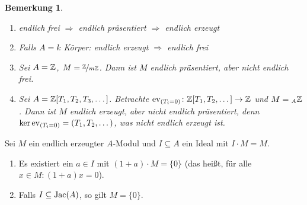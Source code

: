 \documentclass[12pt,a4paper]{scrartcl}
\theoremstyle{cplain}
\theoremstyle{cdef}
\newtheorem{beme}[thmcounter]{Bemerkung}
\begin{document}
\begin{beme}\label{bem:2.17}
	\leavevmode
	\begin{enumerate}
		\item endlich frei $\Rightarrow$ endlich präsentiert $\Rightarrow$ endlich erzeugt
		\item Falls $A = k$ Körper: endlich erzeugt $\Rightarrow$ endlich frei
		\item Sei $A = \mathbb Z$, $M = \nicefrac{\mathbb Z}{m\mathbb Z}$. Dann ist $M$ endlich präsentiert, aber nicht endlich frei.
		\item Sei $A = \mathbb Z[T_1,T_2,T_3,\dots]$. Betrachte $\operatorname{ev}_{(T_i = 0)}\colon \mathbb Z[T_1,T_2,\dots]\to \mathbb Z$ und $M = {}_A\mathbb Z$. Dann ist $M$ endlich erzeugt, aber nicht endlich präsentiert, denn $\operatorname{ker}\operatorname{ev}_{(T_i = 0)}= (T_1,T_2,\dots)$, was nicht endlich erzeugt ist.
	\end{enumerate}
\end{beme}
\begin{lem} \label{lem:nakayama}
	Sei $M$ ein endlich erzeugter $A$-Modul und $I\subseteq A$ ein Ideal mit $I \cdot M = M$.
	\begin{enumerate}
		\item \label{lem:nakayama:i} Es existiert ein $a\in I$ mit $(1+a)\cdot M = \{0\}$ (das heißt, für alle $x\in M: (1+a)x = 0$).
		\item Falls $I\subseteq\operatorname{Jac}(A)$, so gilt $M = \{0\}$. \label{lem:nakayama:ii}
	\end{enumerate}
\end{lem}
\end{document}
